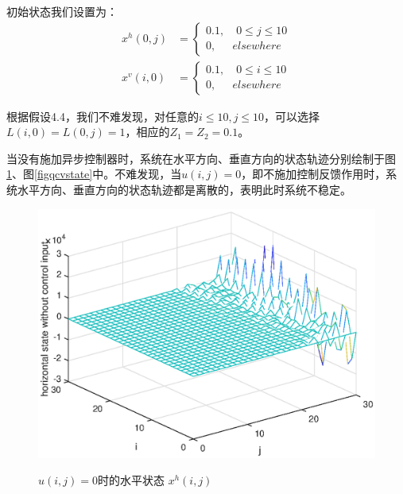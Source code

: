 	
	初始状态我们设置为：
	\begin{equation*}
	\begin{aligned}
	x^{h}(0, j)&=\begin{cases}
	0.1, \quad 0\leq j \leq 10 \\
	0, \quad \ \ elsewhere
	\end{cases} \\
	x^{v}(i, 0)&=\begin{cases}
	0.1, \quad 0\leq i \leq 10 \\
	0, \quad \ \ elsewhere
	\end{cases}
	\end{aligned}
	\end{equation*}
	
	根据假设4.4，我们不难发现，对任意的$i\leq10,j\leq10$，可以选择$L(i,0)=L(0,j)=1$，相应的$Z_1=Z_2=0.1$。
	
	当没有施加异步控制器时，系统在水平方向、垂直方向的状态轨迹分别绘制于图\ref{figqchstate}、图\ref{figqcvstate}中。不难发现，当$u(i,j)=0$，即不施加控制反馈作用时，系统水平方向、垂直方向的状态轨迹都是离散的，表明此时系统不稳定。
	
	\begin{figure}[!htb]
		\centering\includegraphics[scale=0.6]{./figures/qc/simulation/hstateU0.eps}\\ 
		\caption{$u(i,j)=0$时的水平状态 $x^{h}(i,j)$}
		\label{figqchstate}
	\end{figure}
	
